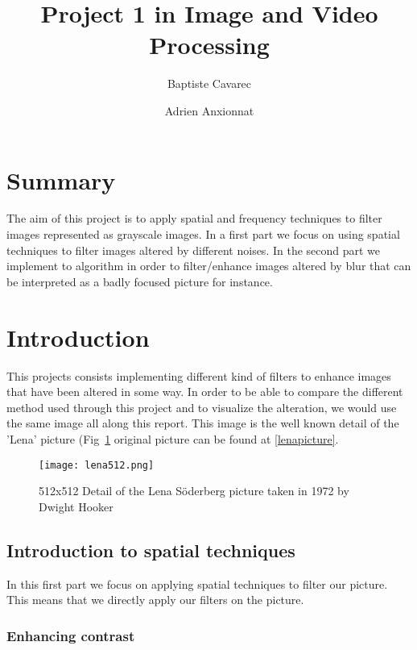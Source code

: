 \documentclass[a4paper]{article}
\begin{document}
\title{Project 1 in  Image and Video Processing}
\author{Baptiste Cavarec \and Adrien Anxionnat}

\maketitle

\section*{Summary}
\label{sec:summary}

The aim of this project is to apply spatial and frequency techniques to filter images represented as grayscale images. In a first part we focus on using spatial techniques to filter images altered by different noises. In the second part we implement to algorithm in order to filter/enhance images altered by blur that can be interpreted as a badly focused picture for instance.

\section{Introduction}
\label{sec:introduction}
This projects consists implementing different kind of filters to enhance images that have been altered in some way. In order to be able to compare the different method used through this project and to visualize the alteration, we would use the same image all along this report. This image is the well known detail of the 'Lena' picture (Fig~\ref{fig:lena} original picture can be found at \ref{lenapicture}.
\begin{figure}[!ht]
  \centering
  \texttt{[image: lena512.png]}
  \caption{512x512 Detail of the Lena Söderberg picture taken in 1972 by Dwight Hooker}
  \label{fig:lena}
\end{figure}

\subsection{Introduction to spatial techniques}

In this first part we focus on applying spatial techniques to filter our picture. This means that we directly apply our filters on the picture. 

\subsubsection{Enhancing contrast}
\end{document}
